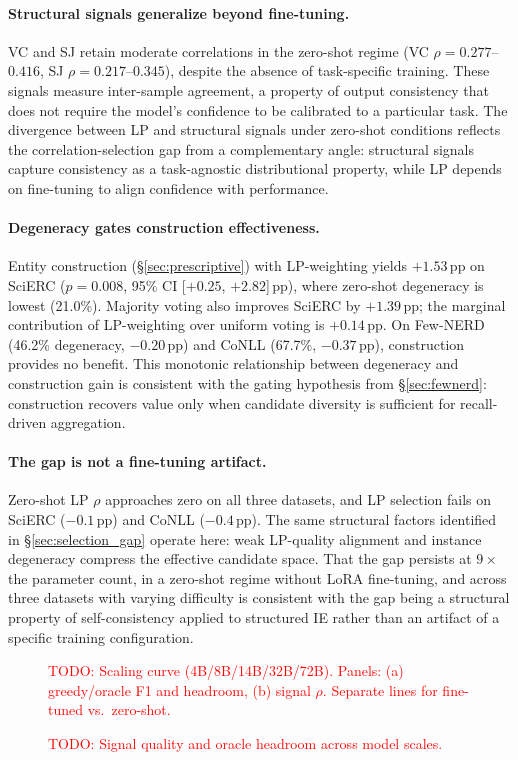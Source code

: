 \paragraph{Structural signals generalize beyond fine-tuning.}
VC and SJ retain moderate correlations in the zero-shot regime (VC $\rho{=}0.277$--$0.416$, SJ $\rho{=}0.217$--$0.345$), despite the absence of task-specific training.
These signals measure inter-sample agreement, a property of output consistency that does not require the model's confidence to be calibrated to a particular task.
The divergence between LP and structural signals under zero-shot conditions reflects the correlation-selection gap from a complementary angle: structural signals capture consistency as a task-agnostic distributional property, while LP depends on fine-tuning to align confidence with performance.

\paragraph{Degeneracy gates construction effectiveness.}
Entity construction (\S\ref{sec:prescriptive}) with LP-weighting yields $+1.53$\,pp on SciERC ($p{=}0.008$, 95\% CI [$+0.25$, $+2.82$]\,pp), where zero-shot degeneracy is lowest (21.0\%).
Majority voting also improves SciERC by $+1.39$\,pp; the marginal contribution of LP-weighting over uniform voting is $+0.14$\,pp.
On Few-NERD (46.2\% degeneracy, $-0.20$\,pp) and CoNLL (67.7\%, $-0.37$\,pp), construction provides no benefit.
This monotonic relationship between degeneracy and construction gain is consistent with the gating hypothesis from \S\ref{sec:fewnerd}: construction recovers value only when candidate diversity is sufficient for recall-driven aggregation.

\paragraph{The gap is not a fine-tuning artifact.}
Zero-shot LP $\rho$ approaches zero on all three datasets, and LP selection fails on SciERC ($-0.1$\,pp) and CoNLL ($-0.4$\,pp).
The same structural factors identified in \S\ref{sec:selection_gap} operate here: weak LP-quality alignment and instance degeneracy compress the effective candidate space.
That the gap persists at $9{\times}$ the parameter count, in a zero-shot regime without LoRA fine-tuning, and across three datasets with varying difficulty is consistent with the gap being a structural property of self-consistency applied to structured IE rather than an artifact of a specific training configuration.

\begin{figure}[t]
\centering
\textcolor{red}{TODO: Scaling curve (4B/8B/14B/32B/72B). Panels: (a) greedy/oracle F1 and headroom, (b) signal $\rho$. Separate lines for fine-tuned vs.\ zero-shot.}
\caption{\textcolor{red}{TODO: Signal quality and oracle headroom across model scales.}}
\label{fig:scaling_curve}
\end{figure}

